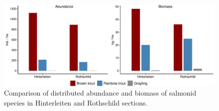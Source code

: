 \begin{figure}[!htb]                              %
	\center
	\includegraphics[width=.9\textwidth]{images/section.pdf}                %
	\caption{Comparison of distributed abundance and biomass of salmonid species in Hinterleiten and Rothschild sections.}        %
	\label{fig:AB_section}                                                       %
\end{figure}



